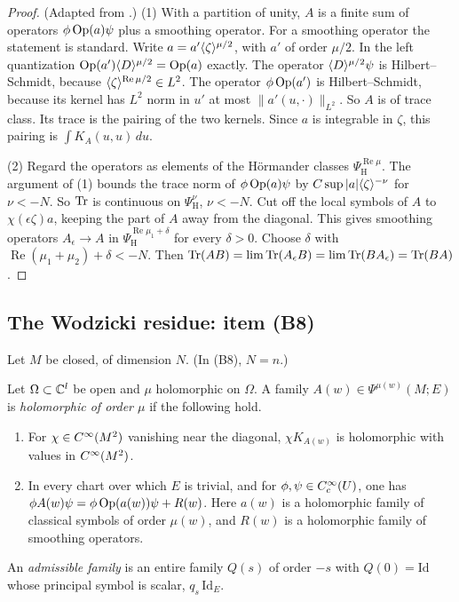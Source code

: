 \begin{proof}
(Adapted from \cite[Ch.~15]{MelroseMicro}.) (1) With a partition of unity,
\(A\) is a finite sum of operators \(\phi\operatorname{Op}(a)\psi\) plus a smoothing
operator. For a smoothing operator the statement is standard. Write
\(a=a'\langle \zeta\rangle^{\mu/2}\), with \(a'\) of order \(\mu/2\). In the left
quantization \(\operatorname{Op}(a')\langle D\rangle^{\mu/2}=\operatorname{Op}(a)\) exactly. The operator
\(\langle D\rangle^{\mu/2}\psi\) is Hilbert--Schmidt, because \(\langle \zeta\rangle^{\operatorname{Re}\mu/2}\in L^2\). The operator \(\phi\operatorname{Op}(a')\) is
Hilbert--Schmidt, because its kernel has \(L^2\) norm in \(u'\) at most
\(\|a'(u,\cdot)\|_{L^2}\). So \(A\) is of trace class. Its trace is the
pairing of the two kernels. Since \(a\) is integrable in \(\zeta\), this
pairing is \(\int K_A(u,u)\,du\).

(2) Regard the operators as elements of the H\"ormander classes
\(\Psi^{\operatorname{Re}\mu}_{\mathrm H}\). The argument of (1) bounds the
trace norm of \(\phi\operatorname{Op}(a)\psi\) by \(C\sup|a|\langle \zeta\rangle^{-\nu}\) for
\(\nu<-N\). So \(\operatorname{Tr}\) is continuous on \(\Psi^\nu_{\mathrm H}\), \(\nu<-N\).
Cut off the local symbols of \(A\) to \(\chi(\epsilon\zeta)a\), keeping the
part of \(A\) away from the diagonal. This gives smoothing operators
\(A_\epsilon\to A\) in \(\Psi^{\operatorname{Re}\mu_1+\delta}_{\mathrm H}\)
for every \(\delta>0\). Choose \(\delta\) with
\(\operatorname{Re}(\mu_1+\mu_2)+\delta<-N\). Then \(\operatorname{Tr}(AB)=\lim\operatorname{Tr}(A_\epsilon
B)=\lim\operatorname{Tr}(BA_\epsilon)=\operatorname{Tr}(BA)\).
\end{proof}

\subsection{The Wodzicki residue: item (B8)}\label{tr:subsec:res}

Let \(M\) be closed, of dimension \(N\). (In (B8), \(N=n\).)

\begin{definition}\label{tr:def:holM}
Let \(\Omega\subset\mathbb C^l\) be open and \(\mu\) holomorphic on \(\Omega\). A
family \(A(w)\in\Psi^{\mu(w)}(M;E)\) is \emph{holomorphic of order \(\mu\)}
if the following hold.
\begin{enumerate}
\item For \(\chi\in C^\infty(M^2)\) vanishing near the diagonal, \(\chi K_{A(w)}\)
is holomorphic with values in \(C^\infty(M^2)\).
\item In every chart over which \(E\) is trivial, and for \(\phi,\psi\in
C^\infty_c(U)\), one has \(\phi A(w)\psi=\phi\operatorname{Op}(a(w))\psi+R(w)\). Here \(a(w)\)
is a holomorphic family of classical symbols of order \(\mu(w)\), and
\(R(w)\) is a holomorphic family of smoothing operators.
\end{enumerate}
An \emph{admissible family} is an entire family \(Q(s)\) of order \(-s\)
with \(Q(0)=\mathrm{Id}\) whose principal symbol is scalar, \(q_s\,
\mathrm{Id}_E\).
\end{definition}

